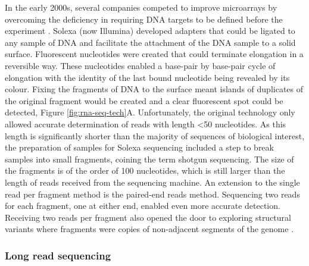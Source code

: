 \documentclass[../main.tex]{subfiles}
\begin{document}
In the early 2000s, several companies competed to improve microarrays by overcoming the deficiency in requiring DNA targets to be defined before the experiment \parencite{Rusk2007}.
Solexa (now Illumina) developed adapters that could be ligated to any sample of DNA and facilitate the attachment of the DNA sample to a solid surface. 
Fluorescent nucleotides were created that could terminate elongation in a reversible way.
These nucleotides enabled a base-pair by base-pair cycle of elongation with the identity of the last bound nucleotide being revealed by its colour.
Fixing the fragments of DNA to the surface meant islands of duplicates of the original fragment would be created and a clear fluorescent spot could be detected, Figure \ref{fig:rna-seq-tech}A.
Unfortunately, the original technology only allowed accurate determination of reads with length <50 nucleotides.
As this length is significantly shorter than the majority of sequences of biological interest, the preparation of samples for Solexa sequencing included a step to break samples into small fragments, coining the term shotgun sequencing.
The size of the fragments is of the order of 100 nucleotides, which is still larger than the length of reads received from the sequencing machine.
An extension to the single read per fragment method is the paired-end reads method.
Sequencing two reads for each fragment, one at either end, enabled even more accurate detection.
Receiving two reads per fragment also opened the door to exploring structural variants where fragments were copies of non-adjacent segments of the genome \parencite{Risca2015}.

\subsubsection{Long read sequencing}
\end{document}
